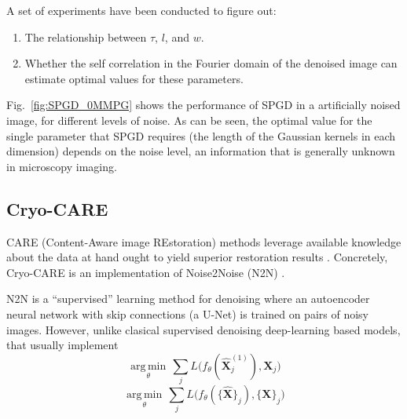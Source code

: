 \documentclass{article}
\begin{document}
A set of experiments have been conducted to figure out:
\begin{enumerate}
\item The relationship between $\tau$, $l$, and $w$.
\item Whether the self correlation in the Fourier domain of the
  denoised image can estimate optimal values for these parameters.
\end{enumerate}

Fig.~\ref{fig:SPGD_0MMPG} shows the performance of SPGD in a artificially
noised image, for different levels of noise. As can be seen, the
optimal value for the single parameter that SPGD requires (the length of
the Gaussian kernels in each dimension) depends on the noise level, an
information that is generally unknown in microscopy imaging.







\subsection{Cryo-CARE \cite{buchholz2019cryo}}

CARE (Content-Aware image REstoration) methods leverage
available knowledge about the data at hand ought to yield superior
restoration results \cite{weigert2018content}. Concretely, Cryo-CARE
is an implementation of Noise2Noise (N2N) \cite{lehtinen2018noise2noise}.

N2N is a ``supervised'' learning method for denoising where an
autoencoder neural network with skip connections (a U-Net) is trained
on pairs of noisy images. However, unlike clasical supervised
denoising deep-learning based models, that usually implement
\cite{lehtinen2018noise2noise}
\begin{equation}
  \underset{\theta}{\operatorname{arg\,min}} \, \sum_j L \big(f_\theta(\hat{\mathbf X}_j^{(1)}), {\mathbf X}_j\big)
\end{equation}
\begin{equation}
  \underset{\theta}{\operatorname{arg\,min}} \, \sum_j L \big(f_\theta(\{\hat{\mathbf X}\}_j), \{{\mathbf X}\}_j\big)
\end{equation}
\end{document}
